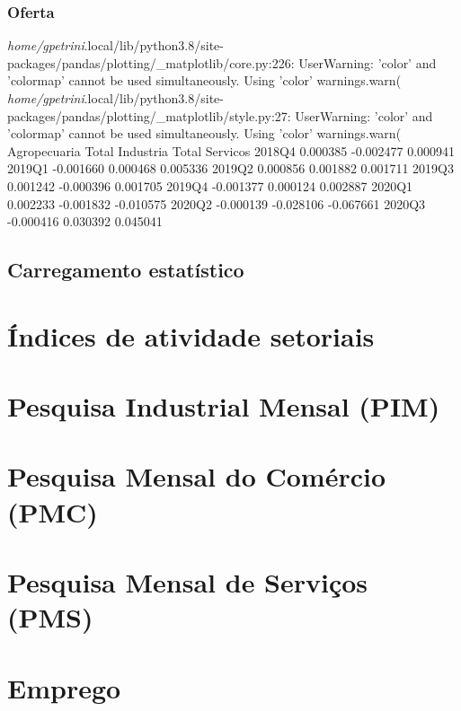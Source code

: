 \documentclass{SelfArx}
\begin{document}
\subsubsection*{Oferta}
\label{sec:org71972ee}

\emph{home/gpetrini}.local/lib/python3.8/site-packages/pandas/plotting/\_matplotlib/core.py:226: UserWarning: 'color' and 'colormap' cannot be used simultaneously. Using 'color'
  warnings.warn(
\emph{home/gpetrini}.local/lib/python3.8/site-packages/pandas/plotting/\_matplotlib/style.py:27: UserWarning: 'color' and 'colormap' cannot be used simultaneously. Using 'color'
  warnings.warn(
        Agropecuaria  Total Industria  Total Servicos
2018Q4      0.000385        -0.002477        0.000941
2019Q1     -0.001660         0.000468        0.005336
2019Q2      0.000856         0.001882        0.001711
2019Q3      0.001242        -0.000396        0.001705
2019Q4     -0.001377         0.000124        0.002887
2020Q1      0.002233        -0.001832       -0.010575
2020Q2     -0.000139        -0.028106       -0.067661
2020Q3     -0.000416         0.030392        0.045041

\subsection*{Carregamento estatístico}
\label{sec:orge023eb8}



\section*{Índices de atividade setoriais}
\label{sec:org3a476e0}


\section*{Pesquisa Industrial Mensal (PIM)}
\label{sec:org7465edf}


\section*{Pesquisa Mensal do Comércio (PMC)}
\label{sec:org768df66}


\section*{Pesquisa Mensal de Serviços (PMS)}
\label{sec:org7663b39}

\section*{Emprego}
\label{sec:orgac24bb1}
\end{document}
